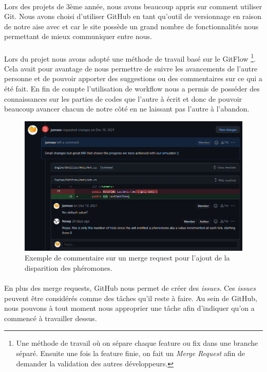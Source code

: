 \documentclass{EPUProjetDi}
\begin{document}
\paragraph{}
Lors des projets de 3ème année, nous avons beaucoup appris sur comment utiliser
Git. Nous avons choisi d'utiliser GitHub en tant qu'outil de versionnage en raison de notre aise avec et
car le site possède un grand nombre de fonctionnalités nous permettant de mieux communiquer entre
nous.

\paragraph{}
Lors du projet nous avons adopté une méthode de travail basé sur le GitFlow 
\footnote{Une méthode de travail où on sépare chaque feature ou fix dans une branche séparé.
Ensuite une fois la feature finie, on fait un \textit{Merge Request} afin de demander la validation des autres développeurs.}. 
Cela avait pour avantage de nous permettre de suivre les avancements de l'autre personne et de pouvoir 
apporter des suggestions ou des commentaires sur ce qui a été fait. 
En fin de compte l'utilisation de workflow nous a permis de posséder des connaissances sur 
les parties de codes que l'autre à écrit et donc de pouvoir beaucoup avancer chacun de notre
côté en ne laissant pas l'autre à l'abandon.

\begin{figure}[h!]
\centering
\includegraphics[scale=.5]{MergeRequest.png}
\caption{Exemple de commentaire sur un merge request pour l'ajout de la disparition des phéromones.}
\label{fig:MergeRequest}
\end{figure}

\paragraph{}
En plus des merge requests, GitHub nous permet de créer des \textit{issues}.
Ces \textit{issues} peuvent être considérés comme des tâches qu'il reste à faire. Au sein de GitHub, nous
pouvons à tout moment nous approprier une tâche afin d'indiquer qu'on a commencé à travailler dessus.
\end{document}
